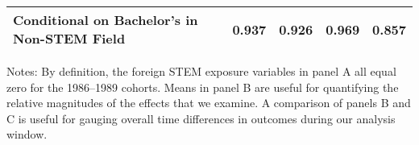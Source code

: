 \begin{table}[ht]
{\begin{threeparttable}
\begin{tabular}{lcccc}
Conditional on Bachelor's in Non-STEM Field             & 0.937 & 0.926 & 0.969 & 0.857 \\ 
\bottomrule 
\end{tabular} 
\footnotesize Notes: By definition, the foreign STEM exposure variables in panel A all equal zero for the 1986--1989 cohorts. Means in panel B are useful for quantifying the relative magnitudes of the effects that we examine. A comparison of panels B and C is useful for gauging overall time differences in outcomes during our analysis window.
\end{threeparttable} 
}
\end{table} 
